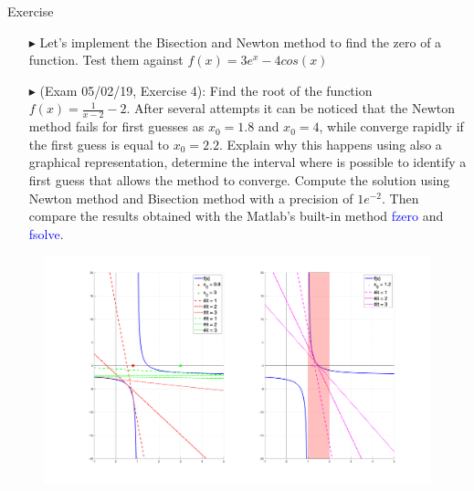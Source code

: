 \documentclass[xcolor={dvipsnames,rgb}, aspectratio=169]{beamer}
\begin{document}
\begin{frame}{Exercise}
   \begin{itemize}
      \item[$\blacktriangleright$] Let's implement the \alert{Bisection} and
         \alert{Newton} method to find the zero of a function. Test them against $f(x) =
         3e^{x} - 4cos(x)$
      \item[$\blacktriangleright$] (Exam 05/02/19, Exercise 4): Find the root of the
         function $f(x) = \frac{1}{x-2} - 2$. After several attempts it can be noticed
         that the Newton method fails for first guesses as $x_{0} = 1.8$ and $x_{0} = 4$,
         while converge rapidly if the first guess is equal to $x_{0} = 2.2$. Explain why
         this happens using also a graphical representation, determine the interval where
         is possible to identify a first guess that allows the method to converge.
         Compute the solution using Newton method and Bisection method with a precision
         of $1e^{-2}$. Then compare the results obtained with the Matlab's built-in
         method \textcolor{blue}{fzero} and \textcolor{blue}{fsolve}.
   \end{itemize}
\end{frame}

\begin{frame}{}
   \begin{figure}
      \centering
      \includegraphics[width=1.\textwidth]{figures/newton_choose.png}
   \end{figure}
\end{frame}
\end{document}
